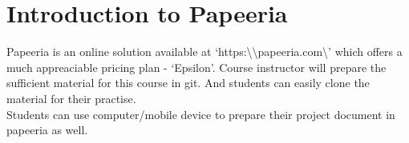 \documentclass{article}
\begin{document}
\section{Introduction to Papeeria}
Papeeria is an online solution available at `https:\textbackslash\textbackslash papeeria.com\textbackslash' which offers a much appreaciable pricing plan - `Epsilon'. Course instructor will prepare the sufficient material for this course in git. And students can easily clone the material for their practise.\\

	Students can use computer/mobile device to prepare their project document in papeeria as well.
\end{document}
